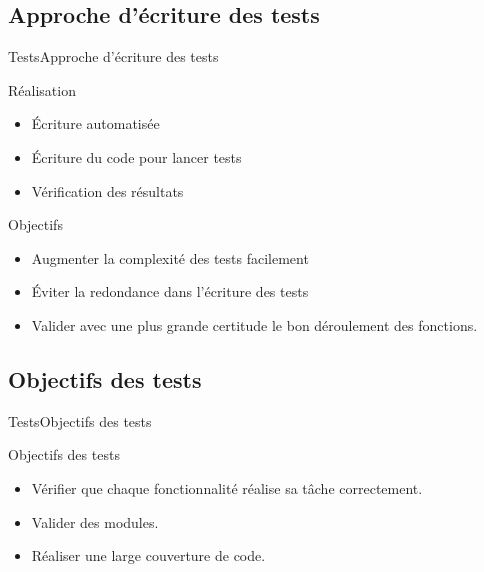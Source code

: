     \subsection{Approche d'écriture des tests}
      \begin{frame}{Tests}{Approche d'écriture des tests}
        \begin{block}{Réalisation}
          \begin{itemize}
            \item<1-> Écriture automatisée
            \item<2-> Écriture du code pour lancer tests
            \item<3-> Vérification des résultats
          \end{itemize}
        \end{block}
        \begin{block}{Objectifs}
          \begin{itemize}
            \item<4-> Augmenter la complexité des tests facilement
            \item<5-> Éviter la redondance dans l'écriture des tests
            \item<6-> Valider avec une plus grande certitude le bon déroulement des fonctions.
          \end{itemize}
        \end{block}
      \end{frame}

      \subsection{Objectifs des tests}
      \begin{frame}{Tests}{Objectifs des tests}
        \begin{block}{Objectifs des tests}
          \begin{itemize}
            \item<1-> Vérifier que chaque fonctionnalité réalise sa tâche correctement.
            \item<2-> Valider des modules.
            \item<3-> Réaliser une large couverture de code.
          \end{itemize}
        \end{block}
      \end{frame}  
